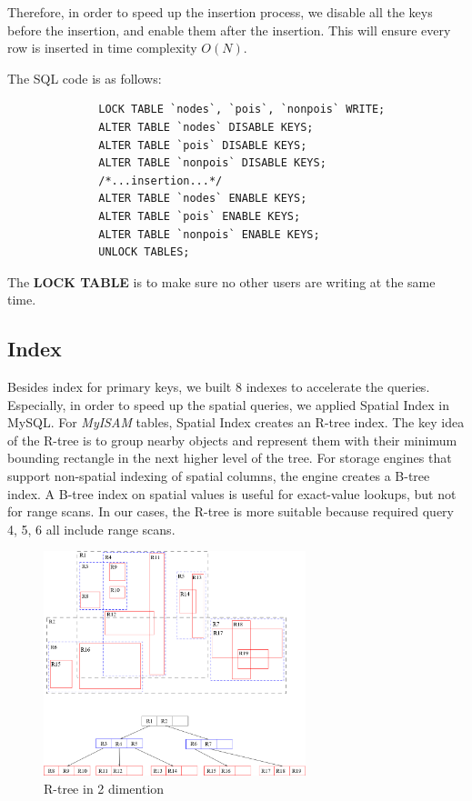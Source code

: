 \documentclass[final,1p,times]{elsarticle}
\begin{document}
Therefore, in order to speed up the insertion process, we disable all the keys before the insertion, and enable them after the insertion. This will ensure every row is inserted in time complexity $O(N)$.

The SQL code is as follows:

\begin{verbatim}
              LOCK TABLE `nodes`, `pois`, `nonpois` WRITE;
              ALTER TABLE `nodes` DISABLE KEYS;
              ALTER TABLE `pois` DISABLE KEYS;
              ALTER TABLE `nonpois` DISABLE KEYS;
              /*...insertion...*/
              ALTER TABLE `nodes` ENABLE KEYS;
              ALTER TABLE `pois` ENABLE KEYS;
              ALTER TABLE `nonpois` ENABLE KEYS;
              UNLOCK TABLES;
\end{verbatim}

The \textbf{LOCK TABLE} is to make sure no other users are writing at the same time.
\subsection{Index}
Besides index for primary keys, we built 8 indexes to accelerate the queries. Especially, in order to speed up the spatial queries, we applied Spatial Index in MySQL. For \emph{MyISAM} tables, Spatial Index creates an R-tree index. The key idea of the R-tree is to group nearby objects and represent them with their minimum bounding rectangle in the next higher level of the tree. For storage engines that support non-spatial indexing of spatial columns, the engine creates a B-tree index. A B-tree index on spatial values is useful for exact-value lookups, but not for range scans. In our cases, the R-tree is more suitable because required query 4, 5, 6 all include range scans.

\begin{figure}[thpb]
      \centering
      \includegraphics[width=3in]{R-tree.png}
      \caption{R-tree in 2 dimention}
      \label{fig:Rtree}
\end{figure}
\end{document}
